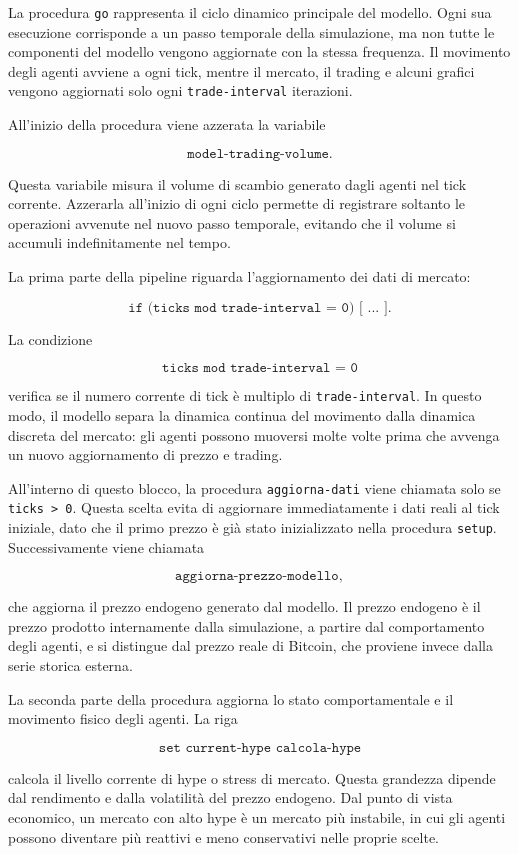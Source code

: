 La procedura \texttt{go} rappresenta il ciclo dinamico principale del modello.
Ogni sua esecuzione corrisponde a un passo temporale della simulazione, ma non
tutte le componenti del modello vengono aggiornate con la stessa frequenza.
Il movimento degli agenti avviene a ogni tick, mentre il mercato, il trading e
alcuni grafici vengono aggiornati solo ogni \texttt{trade-interval} iterazioni.

All'inizio della procedura viene azzerata la variabile

\[
\texttt{model-trading-volume}.
\]

Questa variabile misura il volume di scambio generato dagli agenti nel tick
corrente. Azzerarla all'inizio di ogni ciclo permette di registrare soltanto le
operazioni avvenute nel nuovo passo temporale, evitando che il volume si accumuli
indefinitamente nel tempo.

La prima parte della pipeline riguarda l'aggiornamento dei dati di mercato:

\[
\texttt{if (ticks mod trade-interval = 0) [ ... ]}.
\]

La condizione

\[
\texttt{ticks mod trade-interval = 0}
\]

verifica se il numero corrente di tick è multiplo di \texttt{trade-interval}.
In questo modo, il modello separa la dinamica continua del movimento dalla
dinamica discreta del mercato: gli agenti possono muoversi molte volte prima che
avvenga un nuovo aggiornamento di prezzo e trading.

All'interno di questo blocco, la procedura \texttt{aggiorna-dati} viene chiamata
solo se \texttt{ticks > 0}. Questa scelta evita di aggiornare immediatamente i
dati reali al tick iniziale, dato che il primo prezzo è già stato inizializzato
nella procedura \texttt{setup}. Successivamente viene chiamata

\[
\texttt{aggiorna-prezzo-modello},
\]

che aggiorna il prezzo endogeno generato dal modello. Il prezzo endogeno è il
prezzo prodotto internamente dalla simulazione, a partire dal comportamento degli
agenti, e si distingue dal prezzo reale di Bitcoin, che proviene invece dalla
serie storica esterna.

La seconda parte della procedura aggiorna lo stato comportamentale e il movimento
fisico degli agenti. La riga

\[
\texttt{set current-hype calcola-hype}
\]

calcola il livello corrente di hype o stress di mercato. Questa grandezza dipende
dal rendimento e dalla volatilità del prezzo endogeno. Dal punto di vista
economico, un mercato con alto hype è un mercato più instabile, in cui gli
agenti possono diventare più reattivi e meno conservativi nelle proprie scelte.

